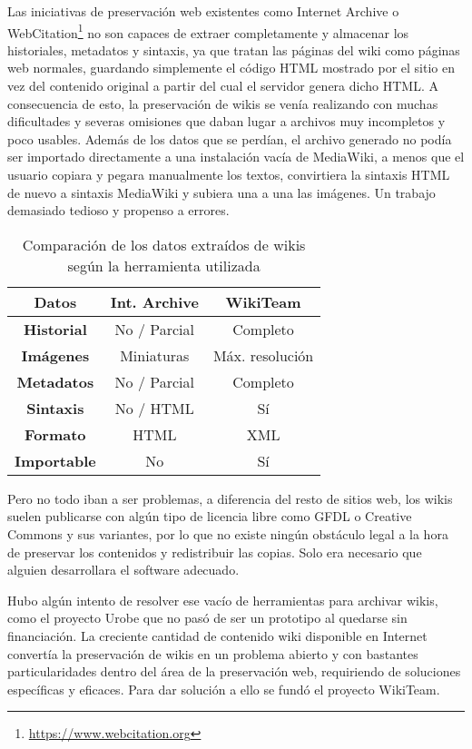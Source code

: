 \documentclass[14pt,twocolumn]{article}
\begin{document}
Las iniciativas de preservación web existentes como Internet Archive o WebCitation\footnote{\href{https://www.webcitation.org}{https://www.webcitation.org}} no son capaces de extraer completamente y almacenar los historiales, metadatos y sintaxis, ya que tratan las páginas del wiki como páginas web normales, guardando simplemente el código HTML mostrado por el sitio en vez del contenido original a partir del cual el servidor genera dicho HTML. A consecuencia de esto, la preservación de wikis se venía realizando con muchas dificultades y severas omisiones que daban lugar a archivos muy incompletos y poco usables. Además de los datos que se perdían, el archivo generado no podía ser importado directamente a una instalación vacía de MediaWiki, a menos que el usuario copiara y pegara manualmente los textos, convirtiera la sintaxis HTML de nuevo a sintaxis MediaWiki y subiera una a una las imágenes. Un trabajo demasiado tedioso y propenso a errores.

\begin{table}[]
	\centering
	\caption{Comparación de los datos extraídos de wikis según la herramienta utilizada}
	\label{idiomas}
	\begin{tabular}{|c|c|c|}
		\hline
		\multicolumn{1}{|c|}{\textbf{Datos}} & 
		\multicolumn{1}{|c|}{\textbf{Int. Archive}} & 
		\multicolumn{1}{|c|}{\textbf{WikiTeam}} \\ \hline
		\textbf{Historial} & No / Parcial & Completo \\ \hline
		\textbf{Imágenes} & Miniaturas & Máx. resolución \\ \hline
		\textbf{Metadatos} & No / Parcial & Completo \\ \hline
		\textbf{Sintaxis} & No / HTML & Sí \\ \hline
		\textbf{Formato} & HTML & XML \\ \hline
		\textbf{Importable} & No & Sí \\ \hline
	\end{tabular}
\end{table}

Pero no todo iban a ser problemas, a diferencia del resto de sitios web, los wikis suelen publicarse con algún tipo de licencia libre como GFDL o Creative Commons y sus variantes, por lo que no existe ningún obstáculo legal a la hora de preservar los contenidos y redistribuir las copias. Solo era necesario que alguien desarrollara el software adecuado.

Hubo algún intento de resolver ese vacío de herramientas para archivar wikis, como el proyecto Urobe\cite{popitsch2010} que no pasó de ser un prototipo al quedarse sin financiación. La creciente cantidad de contenido wiki disponible en Internet convertía la preservación de wikis en un problema abierto y con bastantes particularidades dentro del área de la preservación web, requiriendo de soluciones específicas y eficaces. Para dar solución a ello se fundó el proyecto WikiTeam.
\end{document}
